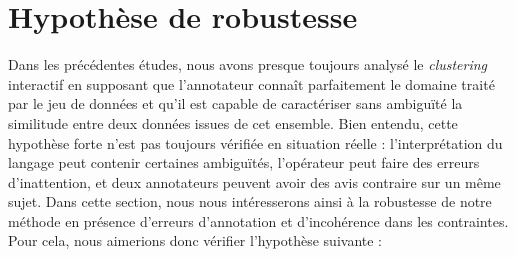 \section{Hypothèse de robustesse}
\label{section:4.6-HYPOTHESE-ROBUSTESSE}


	Dans les précédentes études, nous avons presque toujours analysé le \textit{clustering} interactif en supposant que l'annotateur connaît parfaitement le domaine traité par le jeu de données et qu'il est capable de caractériser sans ambiguïté la similitude entre deux données issues de cet ensemble.
	Bien entendu, cette hypothèse forte n'est pas toujours vérifiée en situation réelle : l'interprétation du langage peut contenir certaines ambiguïtés, l'opérateur peut faire des erreurs d’inattention, et deux annotateurs peuvent avoir des avis contraire sur un même sujet.
	Dans cette section, nous nous intéresserons ainsi à la robustesse de notre méthode en présence d'erreurs d’annotation et d'incohérence dans les contraintes.
	Pour cela, nous aimerions donc vérifier l'hypothèse suivante :
	
